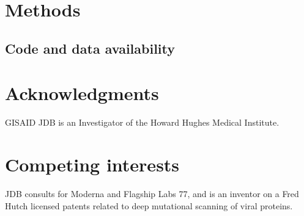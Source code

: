 \documentclass[9pt,twocolumn,twoside]{gsajnl_modified}
\begin{document}
{\small

\section{Methods}
\subsection{Code and data availability}

\section{Acknowledgments}
{\color{red} GISAID}
JDB is an Investigator of the Howard Hughes Medical Institute.

\section{Competing interests}
JDB consults for Moderna and Flagship Labs 77, and is an inventor on a Fred Hutch licensed patents related to deep mutational scanning of viral proteins.

}


\end{document}
